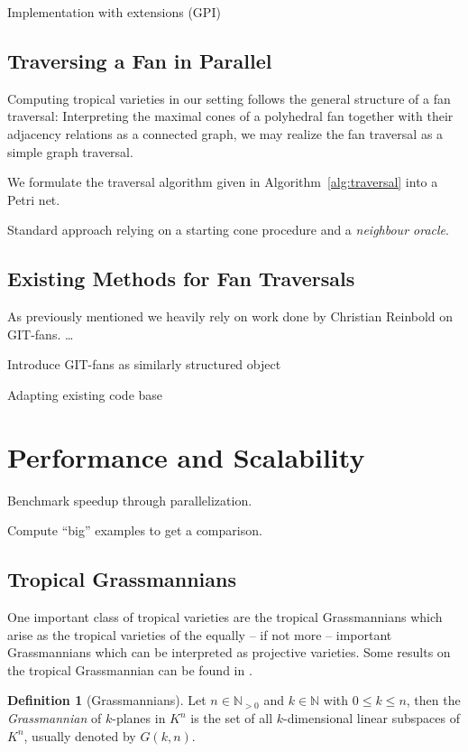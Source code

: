 \documentclass[
  paper=a4,
  titlepage,
  bibliography=totoc,
  listof=totoc,
  pagesize=pdftex
]{scrartcl}
\numberwithin{figure}{section}
\numberwithin{equation}{section}
\numberwithin{table}{section}
\newcommand*\setN{\mathds{N}}
\theoremstyle{definition}
\newtheorem{definition}{Definition}
\numberwithin{definition}{section}
\begin{document}
Implementation with extensions (GPI)

\subsection{Traversing a Fan in Parallel}
\label{sec:traverseParal}

Computing tropical varieties in our setting follows the general structure of a fan
traversal: Interpreting the maximal cones of a polyhedral fan together with their
adjacency relations as a connected graph, we may realize the fan traversal as a simple
graph traversal.

We formulate the traversal algorithm given in Algorithm~\ref{alg:traversal} into a
Petri net.

Standard approach relying on a starting cone procedure and a \emph{neighbour oracle}.

\subsection{Existing Methods for Fan Traversals}

As previously mentioned we heavily rely on work done by Christian Reinbold on GIT-fans.
\dots

Introduce GIT-fans as similarly structured object

Adapting existing code base

\section{Performance and Scalability}

Benchmark speedup through parallelization.

Compute \enquote{big} examples to get a comparison.

\subsection{Tropical Grassmannians}

One important class of tropical varieties are the tropical Grassmannians which arise as
the tropical varieties of the equally -- if not more -- important Grassmannians which can
be interpreted as projective varieties. Some results on the tropical Grassmannian can be
found in \cite{tropGrass}.

\begin{definition}[Grassmannians]
  Let $n \in \setN_{>0}$ and $k \in \setN$ with $0 \leq k \leq n$, then the
  \emph{Grassmannian} of $k$-planes in $K^n$ is the set of all $k$-dimensional linear
  subspaces of $K^n$, usually denoted by $G(k, n)$.
\end{definition}
\end{document}
